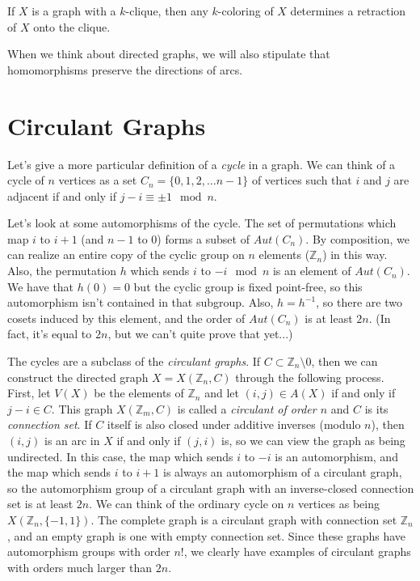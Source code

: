 
If $X$ is a graph with a $k$-clique, then any $k$-coloring of $X$ determines a retraction of $X$ onto the clique.

When we think about directed graphs, we will also stipulate that homomorphisms preserve the directions of arcs.



\section*{Circulant Graphs}

Let's give a more particular definition of a \textit{cycle} in a graph.  We can think of a cycle of $n$ vertices as a set $C_n=\{0,1,2,\dots n-1\}$ of vertices such that $i$ and $j$ are adjacent if and only if $j-i\equiv\pm 1\mod n$.

Let's look at some automorphisms of the cycle.  The set of permutations which map $i$ to $i+1$ (and $n-1$ to $0$) forms a subset of $Aut(C_n)$.  By composition, we can realize an entire copy of the cyclic group on $n$ elements ($\mathbb{Z}_n$) in this way.  Also, the permutation $h$ which sends $i$ to $-i\mod n$ is an element of $Aut(C_n)$.  We have that $h(0)=0$ but the cyclic group is fixed point-free, so this automorphism isn't contained in that subgroup.  Also, $h=h^{-1}$, so there are two cosets induced by this element, and the order of $Aut(C_n)$ is at least $2n$.  (In fact, it's equal to $2n$, but we can't quite prove that yet...)

The cycles are a subclass of the \textit{circulant graphs}.  If $C\subset \mathbb{Z}_n{\setminus}0$, then we can construct the directed graph $X=X(\mathbb{Z}_n,C)$ through the following process.  First, let $V(X)$ be the elements of $\mathbb{Z}_n$ and let $(i,j)\in A(X)$ if and only if $j-i\in C$.  This graph $X(\mathbb{Z}_m,C)$ is called a \textit{circulant of order $n$} and $C$ is its \textit{connection set}.  If $C$ itself is also closed under additive inverses (modulo $n$), then $(i,j)$ is an arc in $X$ if and only if $(j,i)$ is, so we can view the graph as being undirected.  In this case, the map which sends $i$ to $-i$ is an automorphism, and the map which sends $i$ to $i+1$ is always an automorphism of a circulant graph, so the automorphism group of a circulant graph with an inverse-closed connection set is at least $2n$.  We can think of the ordinary cycle on $n$ vertices as being $X(\mathbb{Z}_n,\{-1,1\})$.  The complete graph is a circulant graph with connection set $\mathbb{Z}_n$, and an empty graph is one with empty connection set.  Since these graphs have automorphism groups with order $n!$, we clearly have examples of circulant graphs with orders much larger than $2n$.

